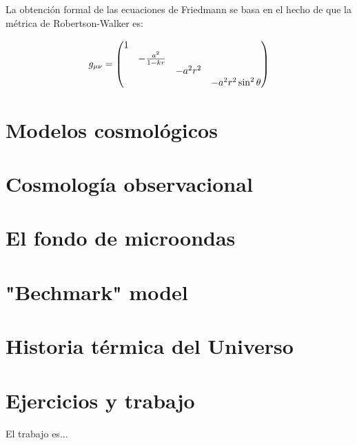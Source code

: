 La obtención formal de las ecuaciones de Friedmann se basa en el hecho de que la métrica de Robertson-Walker es:

\begin{equation}
    g_{\mu \nu} = \mqty(\dmat{1,-\frac{a^2}{1-kr},-a^2 r^2,-a^2 r^2 \sin^2 \theta})
\end{equation}

\section{Modelos cosmológicos}

\section{Cosmología observacional}

\section{El fondo de microondas}

\section{"Bechmark" model}

\section{Historia térmica del Universo}


\section{Ejercicios y trabajo}

El trabajo es...